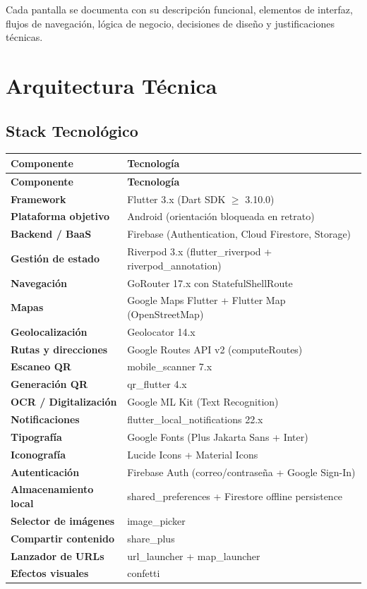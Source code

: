 \documentclass[11pt, a4paper, oneside]{report}
\begin{document}
Cada pantalla se documenta con su descripción funcional, elementos de interfaz, flujos de navegación, lógica de negocio, decisiones de diseño y justificaciones técnicas.

\chapter{Arquitectura Técnica}

\section{Stack Tecnológico}

\begin{longtable}{>{\bfseries}p{4.5cm} p{9cm}}
\toprule
\textbf{Componente} & \textbf{Tecnología} \\
\midrule
\endfirsthead
\toprule
\textbf{Componente} & \textbf{Tecnología} \\
\midrule
\endhead
Framework & Flutter 3.x (Dart SDK $\geq$ 3.10.0) \\
Plataforma objetivo & Android (orientación bloqueada en retrato) \\
Backend / BaaS & Firebase (Authentication, Cloud Firestore, Storage) \\
Gestión de estado & Riverpod 3.x (flutter\_riverpod + riverpod\_annotation) \\
Navegación & GoRouter 17.x con StatefulShellRoute \\
Mapas & Google Maps Flutter + Flutter Map (OpenStreetMap) \\
Geolocalización & Geolocator 14.x \\
Rutas y direcciones & Google Routes API v2 (computeRoutes) \\
Escaneo QR & mobile\_scanner 7.x \\
Generación QR & qr\_flutter 4.x \\
OCR / Digitalización & Google ML Kit (Text Recognition) \\
Notificaciones & flutter\_local\_notifications 22.x \\
Tipografía & Google Fonts (Plus Jakarta Sans + Inter) \\
Iconografía & Lucide Icons + Material Icons \\
Autenticación & Firebase Auth (correo/contraseña + Google Sign-In) \\
Almacenamiento local & shared\_preferences + Firestore offline persistence \\
Selector de imágenes & image\_picker \\
Compartir contenido & share\_plus \\
Lanzador de URLs & url\_launcher + map\_launcher \\
Efectos visuales & confetti \\
\bottomrule
\end{longtable}
\end{document}
